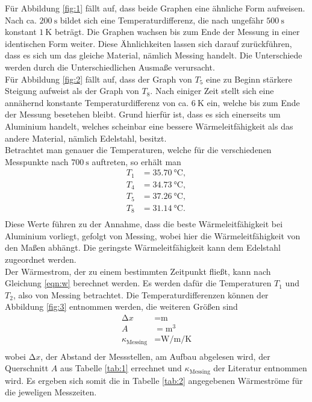 Für Abbildung \ref{fig:1} fällt auf, dass beide Graphen eine ähnliche Form aufweisen.
Nach ca. $\SI{200}{\second}$ bildet sich eine Temperaturdifferenz, die nach ungefähr $\SI{500}{\second}$ konstant $\SI{1}{\kelvin}$ beträgt.
Die Graphen wachsen bis zum Ende der Messung in einer identischen Form weiter.
Diese Ähnlichkeiten lassen sich darauf zurückführen, dass es sich um das gleiche Material, nämlich Messing handelt.
Die Unterschiede werden durch die Unterschiedlichen Ausmaße verursacht.\\
Für Abbildung \ref{fig:2} fällt auf, dass der Graph von $T_5$ eine zu Beginn stärkere Steigung aufweist als der Graph von $T_8$.
Nach einiger Zeit stellt sich eine annähernd konstante Temperaturdifferenz von ca. $\SI{6}{\kelvin}$ ein, welche bis zum Ende der Messung besetehen bleibt.
Grund hierfür ist, dass es sich einerseits um Aluminium handelt, welches scheinbar eine bessere Wärmeleitfähigkeit als das andere Material, nämlich Edelstahl, besitzt.\\
Betrachtet man genauer die Temperaturen, welche für die verschiedenen Messpunkte nach $\SI{700}{\second}$ auftreten, so erhält man
\begin{align*}
  T_1 &= \SI{35.70}{\celsius}, \\
  T_4 &= \SI{34.73}{\celsius}, \\
  T_5 &= \SI{37.26}{\celsius}, \\
  T_8 &= \SI{31.14}{\celsius}. \\
\end{align*}
Diese Werte führen zu der Annahme, dass die beste Wärmeleitfähigkeit bei Aluminium vorliegt, gefolgt von Messing, wobei hier die Wärmeleitfähigkeit von den Maßen abhängt.
Die geringste Wärmeleitfähigkeit kann dem Edelstahl zugeordnet werden.\\
Der Wärmestrom, der zu einem bestimmten Zeitpunkt fließt, kann nach Gleichung \ref{eqn:w} berechnet werden.
Es werden dafür die Temperaturen $T_1$ und $T_2$, also von Messing betrachtet.
Die Temperaturdifferenzen können der Abbildung \ref{fig:3} entnommen werden, die weiteren Größen sind
\begin{align*}
  \increment{x} &= \si{\metre} \\
  A &= \si{\metre\tothe{3}} \\
  \kappa_\text{Messing} &= \si{\watt\per\metre\per\kelvin} \\
\end{align*}
wobei $\increment{x}$, der Abstand der Messstellen, am Aufbau abgelesen wird, der Querschnitt $A$ aus Tabelle \ref{tab:1} errechnet und $\kappa_\text{Messing}$ der Literatur entnommen wird.
Es ergeben sich somit die in Tabelle \ref{tab:2} angegebenen Wärmeströme für die jeweligen Messzeiten.

